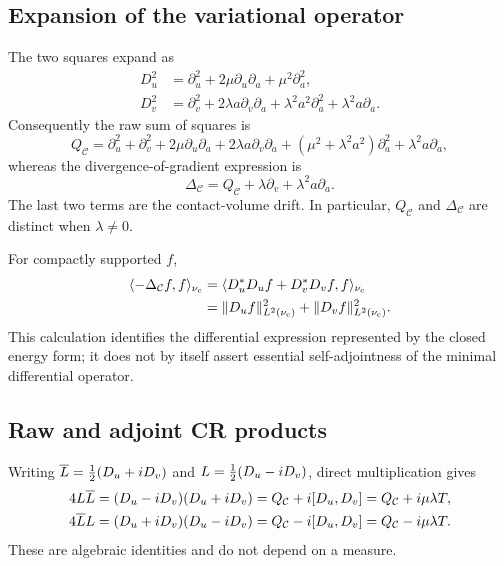 \subsection{Expansion of the variational operator}

The two squares expand as
\begin{align*}
 D_u^2
 &=\partial_u^2+2\mu\partial_u\partial_a+\mu^2\partial_a^2,\\
 D_v^2
 &=\partial_v^2+2\lambda a\partial_v\partial_a
   +\lambda^2a^2\partial_a^2+\lambda^2a\partial_a.
\end{align*}
Consequently the raw sum of squares is
\begin{equation}\label{eq:app-contact-raw-expanded}
 Q_{\mathcal C}
 =\partial_u^2+\partial_v^2
  +2\mu\partial_u\partial_a+2\lambda a\partial_v\partial_a
  +(\mu^2+\lambda^2a^2)\partial_a^2
  +\lambda^2a\partial_a,
\end{equation}
whereas the divergence-of-gradient expression is
\begin{equation}\label{eq:app-contact-variational-expanded}
 \Delta_{\mathcal C}
 =Q_{\mathcal C}+\lambda\partial_v+\lambda^2a\partial_a.
\end{equation}
The last two terms are the contact-volume drift.  In particular,
$Q_{\mathcal C}$ and $\Delta_{\mathcal C}$ are distinct when $\lambda\ne0$.

For compactly supported $f$,
\begin{align}
 \langle-\Delta_{\mathcal C}f,f\rangle_{\nu_{\mathrm c}}
 &=\langle D_u^*D_uf+D_v^*D_vf,f\rangle_{\nu_{\mathrm c}}\notag\\
 &=\|D_uf\|_{L^2(\nu_{\mathrm c})}^2
   +\|D_vf\|_{L^2(\nu_{\mathrm c})}^2.
 \label{eq:app-contact-energy}
\end{align}
This calculation identifies the differential expression represented by the
closed energy form; it does not by itself assert essential self-adjointness of
the minimal differential operator.

\subsection{Raw and adjoint CR products}

Writing $\overline L=\frac12(D_u+iD_v)$ and
$L=\frac12(D_u-iD_v)$, direct multiplication gives
\begin{align}
 4L\overline L
 &=(D_u-iD_v)(D_u+iD_v)
   =Q_{\mathcal C}+i[D_u,D_v]
   =Q_{\mathcal C}+i\mu\lambda T,
 \label{eq:app-contact-raw-product-plus}\\
 4\overline LL
 &=(D_u+iD_v)(D_u-iD_v)
   =Q_{\mathcal C}-i[D_u,D_v]
   =Q_{\mathcal C}-i\mu\lambda T.
 \label{eq:app-contact-raw-product-minus}
\end{align}
These are algebraic identities and do not depend on a measure.

